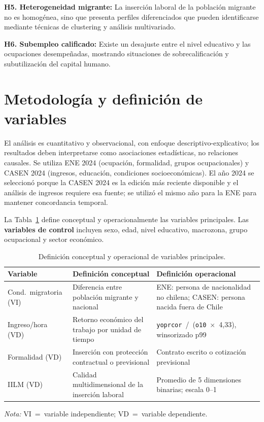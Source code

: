 \textbf{H5. Heterogeneidad migrante:} La inserción laboral de la población migrante no es homogénea, sino que presenta perfiles diferenciados que pueden identificarse mediante técnicas de clustering y análisis multivariado.

\textbf{H6. Subempleo calificado:} Existe un desajuste entre el nivel educativo y las ocupaciones desempeñadas, mostrando situaciones de sobrecalificación y subutilización del capital humano.



\section{Metodología y definición de variables}

El análisis es cuantitativo y observacional, con enfoque descriptivo-explicativo; los resultados deben interpretarse como asociaciones estadísticas, no relaciones causales. Se utiliza ENE 2024 (ocupación, formalidad, grupos ocupacionales) y CASEN 2024 (ingresos, educación, condiciones socioeconómicas). El año 2024 se seleccionó porque la CASEN 2024 es la edición más reciente disponible y el análisis de ingresos requiere esa fuente; se utilizó el mismo año para la ENE para mantener concordancia temporal.

La Tabla~\ref{tab:variables} define conceptual y operacionalmente las variables principales. Las \textbf{variables de control} incluyen sexo, edad, nivel educativo, macrozona, grupo ocupacional y sector económico.

\begin{table}[H]
	\centering
	\caption{Definición conceptual y operacional de variables principales.}
	\label{tab:variables}
	\begin{tabularx}{\textwidth}{l X X}
		\toprule
		\textbf{Variable} & \textbf{Definición conceptual} & \textbf{Definición operacional} \\
		\midrule
		Cond.\ migratoria (VI) & Diferencia entre población migrante y nacional & ENE: persona de nacionalidad no chilena; CASEN: persona nacida fuera de Chile \\[4pt]
		Ingreso/hora (VD) & Retorno económico del trabajo por unidad de tiempo & \texttt{yoprcor}~/~(\texttt{o10}~$\times$~4{,}33), winsorizado p99 \\[4pt]
		Formalidad (VD) & Inserción con protección contractual o previsional & Contrato escrito o cotización previsional \\[4pt]
		IILM (VD) & Calidad multidimensional de la inserción laboral & Promedio de 5 dimensiones binarias; escala 0--1 \\
		\bottomrule
	\end{tabularx}
	\begin{flushleft}
		\footnotesize \textit{Nota:} VI~=~variable independiente; VD~=~variable dependiente.
	\end{flushleft}
\end{table}

